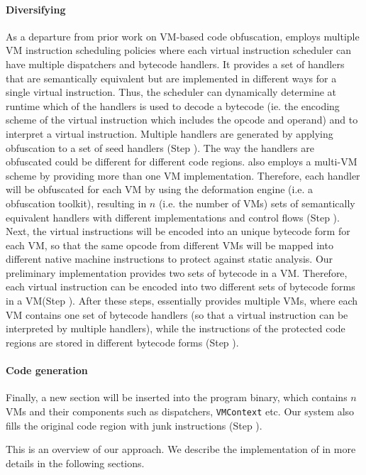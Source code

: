 \paragraph*{Diversifying}
As a departure from prior work on VM-based code obfuscation, \DSVMP employs multiple VM instruction scheduling policies
where each virtual instruction scheduler can have multiple dispatchers and bytecode handlers. It provides a set of handlers
that are semantically equivalent but are implemented in different ways for a single virtual instruction.
Thus, the scheduler can dynamically determine at runtime which of the handlers is used to decode a bytecode (ie. the encoding
scheme of the virtual instruction which includes the opcode and operand) and to interpret a virtual instruction.
Multiple handlers are generated by applying obfuscation to a set of seed handlers (Step ).
The way the handlers are obfuscated could be different for different code regions.
\DSVMP also employs a multi-VM scheme by providing more than one VM implementation.
Therefore, each handler will be obfuscated for each VM by using the deformation engine (i.e. a obfuscation toolkit), resulting in $n$ (i.e. the number of VMs) sets of semantically equivalent handlers with different implementations and control flows (Step ).
Next, the virtual instructions will be encoded into an unique bytecode form for each VM, so that the same opcode from different
VMs will be mapped into different native machine instructions to protect against static analysis.
Our preliminary implementation provides two sets of bytecode in a VM. Therefore, each
virtual instruction can be encoded into two different sets of bytecode forms in a VM(Step ).
After these steps, \DSVMP essentially provides multiple VMs, 
where each VM contains one set of bytecode handlers (so that a virtual instruction can be interpreted by multiple handlers), 
while the instructions of the protected code regions are stored in different bytecode forms (Step ).

\paragraph*{Code generation}
Finally, a new section will be inserted into the program binary, which contains $n$ VMs and their components such as dispatchers, \texttt{VMContext} etc. Our system also fills the original code region with junk instructions (Step ).

This is an overview of our approach. We describe the implementation of \DSVMP in more details in the following sections.
